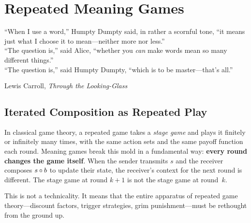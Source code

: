 

\chapter{Repeated Meaning Games}
\label{ch:repeated-deep}

\epigraph{``When I use a word,'' Humpty Dumpty said, in rather a scornful tone,
``it means just what I choose it to mean---neither more nor less.''\\
``The question is,'' said Alice, ``whether you \emph{can} make words mean so many
different things.''\\
``The question is,'' said Humpty Dumpty, ``which is to be master---that's all.''}%
{Lewis Carroll, \emph{Through the Looking-Glass}}


\section{Iterated Composition as Repeated Play}

In classical game theory, a repeated game takes a \emph{stage game} and plays
it finitely or infinitely many times, with the same action sets and the same
payoff function each round.  Meaning games break this mold in a fundamental
way: \textbf{every round changes the game itself}.  When the sender transmits
$s$ and the receiver composes $s \circ b$ to update their state, the
receiver's context for the next round is different.  The stage game at round
$k+1$ is not the stage game at round~$k$.

This is not a technicality.  It means that the entire apparatus of repeated
game theory---discount factors, trigger strategies, grim punishment---must be
rethought from the ground up.

